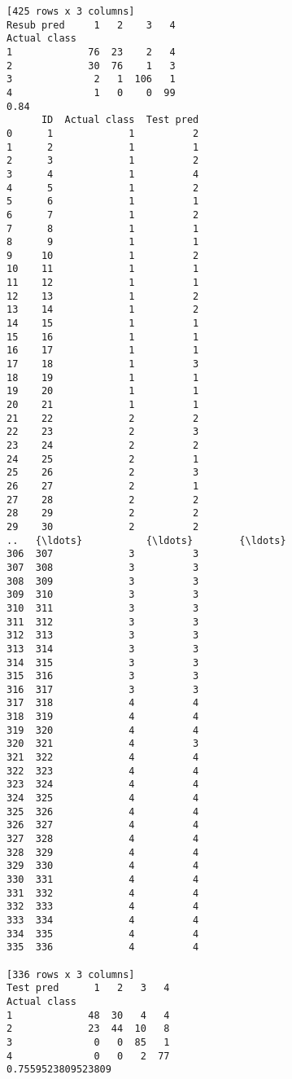 \documentclass[11pt]{article}
\begin{document}
\begin{Verbatim}[commandchars=\\\{\}]
[425 rows x 3 columns]
Resub pred     1   2    3   4
Actual class                 
1             76  23    2   4
2             30  76    1   3
3              2   1  106   1
4              1   0    0  99
0.84
      ID  Actual class  Test pred
0      1             1          2
1      2             1          1
2      3             1          2
3      4             1          4
4      5             1          2
5      6             1          1
6      7             1          2
7      8             1          1
8      9             1          1
9     10             1          2
10    11             1          1
11    12             1          1
12    13             1          2
13    14             1          2
14    15             1          1
15    16             1          1
16    17             1          1
17    18             1          3
18    19             1          1
19    20             1          1
20    21             1          1
21    22             2          2
22    23             2          3
23    24             2          2
24    25             2          1
25    26             2          3
26    27             2          1
27    28             2          2
28    29             2          2
29    30             2          2
..   {\ldots}           {\ldots}        {\ldots}
306  307             3          3
307  308             3          3
308  309             3          3
309  310             3          3
310  311             3          3
311  312             3          3
312  313             3          3
313  314             3          3
314  315             3          3
315  316             3          3
316  317             3          3
317  318             4          4
318  319             4          4
319  320             4          4
320  321             4          3
321  322             4          4
322  323             4          4
323  324             4          4
324  325             4          4
325  326             4          4
326  327             4          4
327  328             4          4
328  329             4          4
329  330             4          4
330  331             4          4
331  332             4          4
332  333             4          4
333  334             4          4
334  335             4          4
335  336             4          4

[336 rows x 3 columns]
Test pred      1   2   3   4
Actual class                
1             48  30   4   4
2             23  44  10   8
3              0   0  85   1
4              0   0   2  77
0.7559523809523809

    \end{Verbatim}


    
    
    
    
\end{document}
